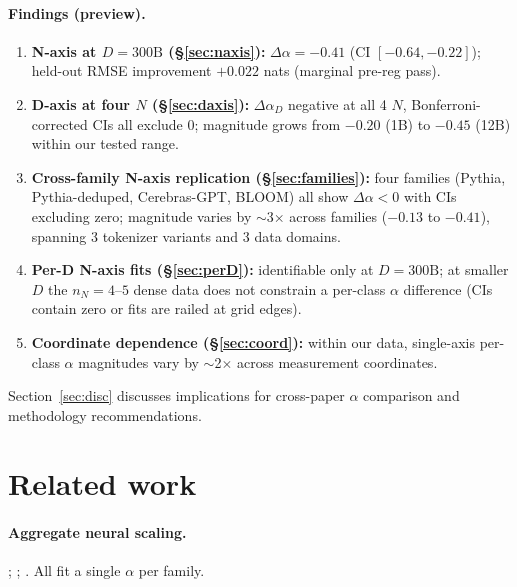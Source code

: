 \documentclass[10pt]{article}
\newcommand{\dalpha}{\Delta\alpha}
\begin{document}
\paragraph{Findings (preview).}
\begin{enumerate}
  \item \textbf{N-axis at $D{=}300\text{B}$ (\S\ref{sec:naxis}):}
        $\dalpha = -0.41$ (CI $[-0.64, -0.22]$); held-out RMSE
        improvement $+0.022$ nats (marginal pre-reg pass).
  \item \textbf{D-axis at four $N$ (\S\ref{sec:daxis}):} $\dalpha_D$
        negative at all 4 $N$, Bonferroni-corrected CIs all exclude 0;
        magnitude grows from $-0.20$ (1B) to $-0.45$ (12B) within
        our tested range.
  \item \textbf{Cross-family N-axis replication (\S\ref{sec:families}):}
        four families (Pythia, Pythia-deduped, Cerebras-GPT, BLOOM)
        all show $\dalpha < 0$ with CIs excluding zero; magnitude
        varies by $\sim$3$\times$ across families ($-0.13$ to $-0.41$),
        spanning 3 tokenizer variants and 3 data domains.
  \item \textbf{Per-D N-axis fits (\S\ref{sec:perD}):} identifiable
        only at $D{=}300\text{B}$; at smaller $D$ the $n_N{=}4$--$5$
        dense data does not constrain a per-class $\alpha$ difference
        (CIs contain zero or fits are railed at grid edges).
  \item \textbf{Coordinate dependence (\S\ref{sec:coord}):} within
        our data, single-axis per-class $\alpha$ magnitudes vary by
        $\sim$2$\times$ across measurement coordinates.
\end{enumerate}
Section~\ref{sec:disc} discusses implications for cross-paper
$\alpha$ comparison and methodology recommendations.

\section{Related work}

\paragraph{Aggregate neural scaling.}
\citet{kaplan2020scaling}; \citet{hoffmann2022chinchilla};
\citet{hestness2017deep}. All fit a single $\alpha$ per family.
\end{document}
